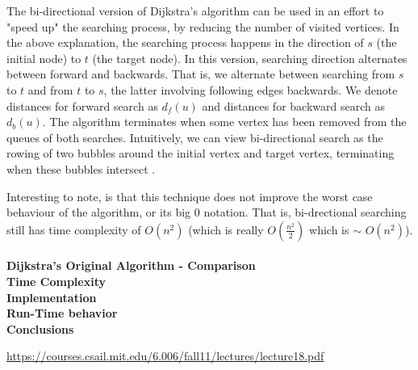 \documentclass[paper=a4, fontsize=11pt]{scrartcl} %
\begin{document}
{The bi-directional version of Dijkstra's algorithm can be used in an effort to "speed up" the searching process, by reducing the number of visited vertices. In the above explanation, the searching process happens in the direction of $s$ (the initial node) to $t$ (the target node). In this version, searching direction alternates between forward and backwards. That is, we alternate between searching from $s$ to $t$ and from $t$ to $s$, the latter involving following edges backwards. We denote distances for forward search as $d_f(u)$ and distances for backward search as $d_b(u)$. The algorithm terminates when some vertex has been removed from the queues of both searches. Intuitively, we can view bi-directional search as the rowing of two bubbles around the initial vertex and target vertex, terminating when these bubbles intersect \cite{mit}.} 
\par Interesting to note, is that this technique does not improve the worst case behaviour of the algorithm, or its big 0 notation. That is, bi-drectional searching still has time complexity of $O(n^2)$ (which is really $O(\frac{n^2}{2})$ which is $\sim$ $O(n^2)$). \\\\
{\bf Dijkstra's Original Algorithm - Comparison}\\
{\bf Time Complexity}\\
{\bf Implementation}\\
{\bf Run-Time behavior}\\
{\bf Conclusions}
\clearpage
\onecolumn
\begin{thebibliography}{9}
 \url{https://courses.csail.mit.edu/6.006/fall11/lectures/lecture18.pdf}
\end{thebibliography}
\end{document}
